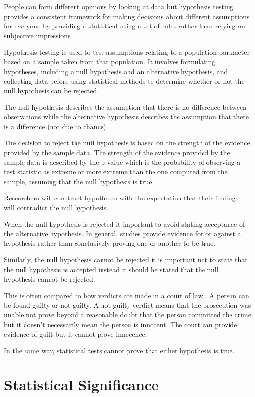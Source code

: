 \documentclass[
]{book}
\begin{document}
People can form different opinions by looking at data but hypothesis testing provides a consistent framework for making decisions about different assumptions for everyone by providing a statistical using a set of rules rather than relying on subjective impressions \citep{pereira}.

Hypothesis testing is used to test assumptions relating to a population parameter based on a sample taken from that population. It involves formulating hypotheses, including a null hypothesis and an alternative hypothesis, and collecting data before using statistical methods to determine whether or not the null hypothesis can be rejected.

The null hypothesis describes the assumption that there is no difference between observations while the alternative hypothesis describes the assumption that there is a difference (not due to chance).

The decision to reject the null hypothesis is based on the strength of the evidence provided by the sample data. The strength of the evidence provided by the sample data is described by the p-value which is the probability of observing a test statistic as extreme or more extreme than the one computed from the sample, assuming that the null hypothesis is true.

Researchers will construct hypotheses with the expectation that their findings will contradict the null hypothesis.

When the null hypothesis is rejected it important to avoid stating acceptance of the alternative hypothesis. In general, studies provide evidence for or against a hypothesis rather than conclusively proving one or another to be true.

Similarly, the null hypothesis cannot be rejected it is important not to state that the null hypothesis is accepted instead it should be stated that the null hypothesis cannot be rejected.

This is often compared to how verdicts are made in a court of law \citep{banerjee}. A person can be found guilty or not guilty. A not guilty verdict means that the prosecution was unable not prove beyond a reasonable doubt that the person committed the crime but it doesn't necessarily mean the person is innocent. The court can provide evidence of guilt but it cannot prove innocence.

In the same way, statistical tests cannot prove that either hypothesis is true.

\hypertarget{statistical-significance}{%
\section{Statistical Significance}\label{statistical-significance}}
\end{document}
